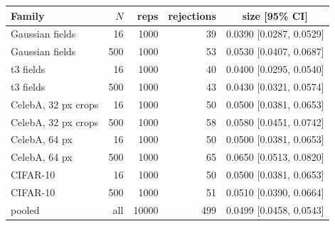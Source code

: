 \begin{tabular}{lrrrc}
\toprule
Family & $N$ & reps & rejections & size [95\% CI] \\
\midrule
Gaussian fields & 16 & 1000 & 39 & 0.0390 [0.0287, 0.0529] \\
Gaussian fields & 500 & 1000 & 53 & 0.0530 [0.0407, 0.0687] \\
t3 fields & 16 & 1000 & 40 & 0.0400 [0.0295, 0.0540] \\
t3 fields & 500 & 1000 & 43 & 0.0430 [0.0321, 0.0574] \\
CelebA, 32 px crops & 16 & 1000 & 50 & 0.0500 [0.0381, 0.0653] \\
CelebA, 32 px crops & 500 & 1000 & 58 & 0.0580 [0.0451, 0.0742] \\
CelebA, 64 px & 16 & 1000 & 50 & 0.0500 [0.0381, 0.0653] \\
CelebA, 64 px & 500 & 1000 & 65 & 0.0650 [0.0513, 0.0820] \\
CIFAR-10 & 16 & 1000 & 50 & 0.0500 [0.0381, 0.0653] \\
CIFAR-10 & 500 & 1000 & 51 & 0.0510 [0.0390, 0.0664] \\
\midrule
pooled & all & 10000 & 499 & 0.0499 [0.0458, 0.0543] \\
\bottomrule
\end{tabular}
